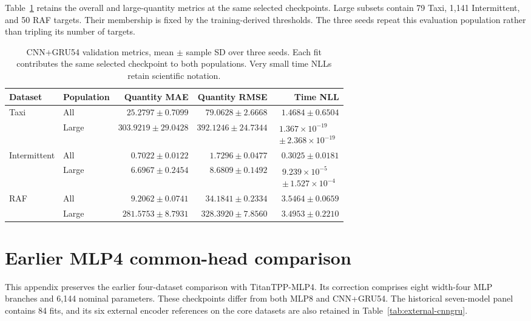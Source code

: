 \documentclass[runningheads]{llncs}
\begin{document}
Table~\ref{tab:cnngru-six} retains the overall and large-quantity metrics at the same selected checkpoints. Large subsets contain 79 Taxi, 1,141 Intermittent, and 50 RAF targets. Their membership is fixed by the training-derived thresholds. The three seeds repeat this evaluation population rather than tripling its number of targets.

\begin{table}[htbp]
\caption{CNN+GRU54 validation metrics, mean $\pm$ sample SD over three seeds. Each fit contributes the same selected checkpoint to both populations. Very small time NLLs retain scientific notation.}
\label{tab:cnngru-six}
\centering\small
\setlength{\tabcolsep}{4pt}
\begin{tabular}{@{}llrrr@{}}
\toprule
Dataset & Population & Quantity MAE & Quantity RMSE & Time NLL\\
\midrule
Taxi & All & $25.2797\pm0.7099$ & $79.0628\pm2.6668$ & $1.4684\pm0.6504$\\
 & Large & $303.9219\pm29.0428$ & $392.1246\pm24.7344$ & $\begin{gathered}1.367\!\times\!10^{-19}\\{\scriptstyle\pm\,2.368\!\times\!10^{-19}}\end{gathered}$\\
\midrule
Intermittent & All & $0.7022\pm0.0122$ & $1.7296\pm0.0477$ & $0.3025\pm0.0181$\\
 & Large & $6.6967\pm0.2454$ & $8.6809\pm0.1492$ & $\begin{gathered}9.239\!\times\!10^{-5}\\{\scriptstyle\pm\,1.527\!\times\!10^{-4}}\end{gathered}$\\
\midrule
RAF & All & $9.2062\pm0.0741$ & $34.1841\pm0.2334$ & $3.5464\pm0.0659$\\
 & Large & $281.5753\pm8.7931$ & $328.3920\pm7.8560$ & $3.4953\pm0.2210$\\
\bottomrule
\end{tabular}
\end{table}
\clearpage

\section{Earlier MLP4 common-head comparison}
\label{app:legacy-external}
This appendix preserves the earlier four-dataset comparison with TitanTPP-MLP4. Its correction comprises eight width-four MLP branches and 6,144 nominal parameters. These checkpoints differ from both MLP8 and CNN+GRU54. The historical seven-model panel contains 84 fits, and its six external encoder references on the core datasets are also retained in Table~\ref{tab:external-cnngru}.
\end{document}
